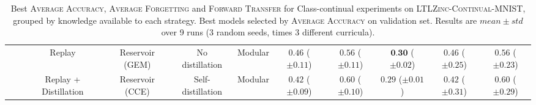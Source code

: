 \begin{table}
{\begin{tabular}{ccccccccccc}
			& & Replay & Reservoir (GEM) & No distillation & Modular & $0.46 $ {\tiny ($\pm 0.11$)} & $0.56 $ {\tiny ($\pm 0.11$)} & $\textbf{0.30} $ {\tiny ($\pm 0.02$)} & $0.46 $ {\tiny ($\pm 0.25$)} & $0.56 $ {\tiny ($\pm 0.23$)}\\
			& & Replay + Distillation & Reservoir (CCE) & Self-distillation & Modular & $0.42 $ {\tiny ($\pm 0.09$)} & $0.60 $ {\tiny ($\pm 0.10$)} & $0.29 $ {\tiny ($\pm 0.01$)} & $0.42 $ {\tiny ($\pm 0.31$)} & $0.60 $ {\tiny ($\pm 0.29$)}\\
			\bottomrule
		\end{tabular}
	}
	\caption[Results on \textsc{LTLZinc-Continual-MNIST}]{Best \textsc{Average Accuracy}, \textsc{Average Forgetting} and \textsc{Forward Transfer} for Class-continual experiments on \textsc{LTLZinc-Continual-MNIST}, grouped by knowledge available to each strategy. Best models selected by \textsc{Average Accuracy} on validation set. Results are $mean \pm std$ over 9 runs (3 random seeds, times 3 different curricula).}
	\label{ltlzinc:tab:incremental-results-mnist}
\end{table}


